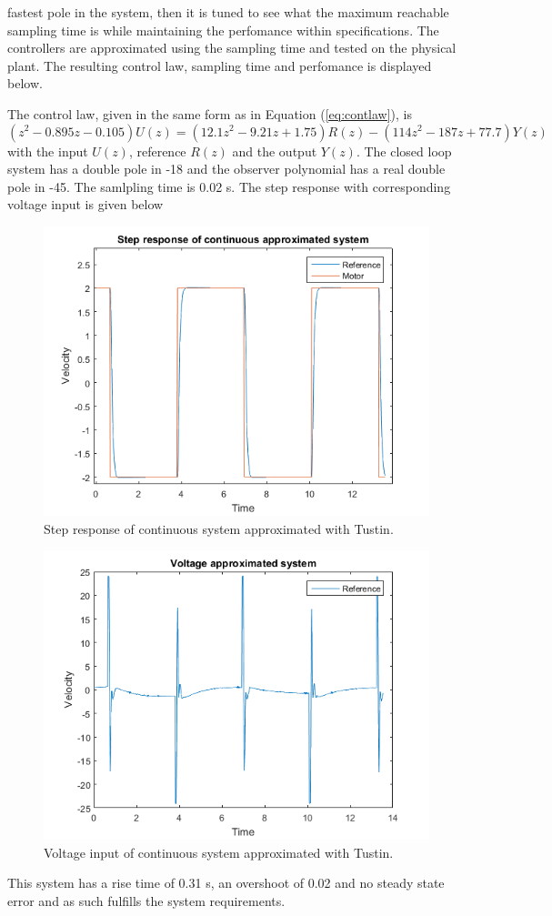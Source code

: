 \documentclass[12pt,a4paper]{article}
\begin{document}
fastest pole in the system, then it is tuned to see what the maximum reachable
sampling time is while maintaining the perfomance within specifications. The
controllers are approximated using the sampling time and tested on the physical
plant. The resulting control law, sampling time and perfomance is displayed
below. \par The control law, given  in the same form as in Equation
(\ref{eq:contlaw}), is
\begin{equation}
    \label{eq:pos_controllaw}
    (z^2 - 0.895z - 0.105) U(z) = (12.1z^2 - 9.21z + 1.75)R(z) - (114z^2 - 187z
    + 77.7)Y(z)
\end{equation}
with the input $U(z)$, reference $R(z)$ and the output $Y(z)$. The closed loop
system has a double pole in -18 and the observer polynomial has a real double
pole in -45. The samlpling time is 0.02 s. The step response with corresponding
voltage input is given below
\begin{figure}[H]
    \centering
    \includegraphics[width=0.8\linewidth]{continuous_level2.png}
    \caption{Step response of continuous system approximated with Tustin.}
    \label{fig:continuous_level2}
\end{figure}
\begin{figure}[H]
    \centering
    \includegraphics[width=0.8\linewidth]{continuous_level2_voltage.png}
    \caption{Voltage input of continuous system approximated with Tustin.}
    \label{fig:continuous_level2}
\end{figure}
This system has a rise time of 0.31 s, an overshoot of 0.02 and no steady state
error and as such fulfills the system requirements.
\end{document}
